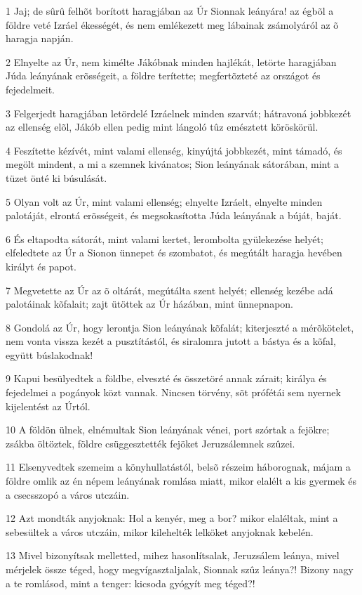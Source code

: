 \par 1 Jaj; de sûrû felhõt borított haragjában az Úr Sionnak leányára! az égbõl a földre veté Izráel ékességét, és nem emlékezett meg lábainak zsámolyáról az õ haragja napján.
\par 2 Elnyelte az Úr, nem kimélte Jákóbnak minden hajlékát, letörte haragjában Júda leányának erõsségeit, a földre terítette; megfertõzteté az országot és fejedelmeit.
\par 3 Felgerjedt haragjában letördelé Izráelnek minden szarvát; hátravoná jobbkezét az ellenség elõl, Jákób ellen pedig mint lángoló tûz emésztett köröskörül.
\par 4 Feszítette kézívét, mint valami ellenség, kinyújtá jobbkezét, mint támadó, és megölt mindent, a mi a szemnek kivánatos; Sion leányának sátorában, mint a tüzet önté ki búsulását.
\par 5 Olyan volt az Úr, mint valami ellenség; elnyelte Izráelt, elnyelte minden palotáját, elrontá erõsségeit, és megsokasította Júda leányának a búját, baját.
\par 6 És eltapodta sátorát, mint valami kertet, lerombolta gyülekezése helyét; elfeledtete az Úr a Sionon ünnepet és szombatot, és megútált haragja hevében királyt és papot.
\par 7 Megvetette az Úr az õ oltárát, megútálta szent helyét; ellenség kezébe adá palotáinak kõfalait; zajt ütöttek az Úr házában, mint ünnepnapon.
\par 8 Gondolá az Úr, hogy lerontja Sion leányának kõfalát; kiterjeszté a mérõkötelet, nem vonta vissza kezét a pusztítástól, és siralomra jutott a bástya és a kõfal, együtt búslakodnak!
\par 9 Kapui besülyedtek a földbe, elveszté és összetöré annak zárait; királya és fejedelmei a pogányok közt vannak. Nincsen törvény, sõt prófétái sem nyernek kijelentést az Úrtól.
\par 10 A földön ülnek, elnémultak Sion leányának vénei, port szórtak a fejökre; zsákba öltöztek, földre csüggesztették fejöket Jeruzsálemnek szûzei.
\par 11 Elsenyvedtek szemeim a könyhullatástól, belsõ részeim háborognak, májam a földre omlik az én népem leányának romlása miatt, mikor elalélt a kis gyermek és a csecsszopó a város utczáin.
\par 12 Azt mondták anyjoknak: Hol a kenyér, meg a bor? mikor elaléltak, mint a sebesültek a város utczáin, mikor kilehelték lelköket anyjoknak kebelén.
\par 13 Mivel bizonyítsak melletted, mihez hasonlítsalak, Jeruzsálem leánya, mivel mérjelek össze téged, hogy megvígasztaljalak, Sionnak szûz leánya?! Bizony nagy a te romlásod, mint a tenger: kicsoda gyógyít meg téged?!

